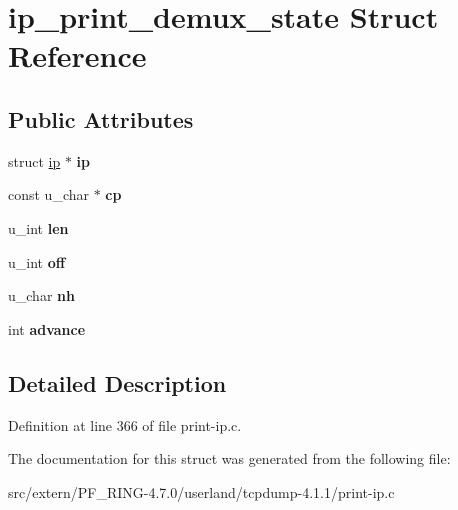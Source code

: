 \hypertarget{structip__print__demux__state}{
\section{ip\_\-print\_\-demux\_\-state Struct Reference}
\label{structip__print__demux__state}
}
\subsection*{Public Attributes}
\begin{DoxyCompactItemize}
\item 
\hypertarget{structip__print__demux__state_a21d3a9f3db1ef7fbed12e53990cbe2c6}{
struct \hyperlink{structip}{ip} $\ast$ {\bfseries ip}}
\label{structip__print__demux__state_a21d3a9f3db1ef7fbed12e53990cbe2c6}

\item 
\hypertarget{structip__print__demux__state_a193656bdacf86e654ac0313e9a2ec096}{
const u\_\-char $\ast$ {\bfseries cp}}
\label{structip__print__demux__state_a193656bdacf86e654ac0313e9a2ec096}

\item 
\hypertarget{structip__print__demux__state_a34bb7647a073879d87ffdd12d3d54f54}{
u\_\-int {\bfseries len}}
\label{structip__print__demux__state_a34bb7647a073879d87ffdd12d3d54f54}

\item 
\hypertarget{structip__print__demux__state_aa793ee83eef36f00cae00e55ce3dc9e9}{
u\_\-int {\bfseries off}}
\label{structip__print__demux__state_aa793ee83eef36f00cae00e55ce3dc9e9}

\item 
\hypertarget{structip__print__demux__state_af060f9badc40d659609a02f775dc9463}{
u\_\-char {\bfseries nh}}
\label{structip__print__demux__state_af060f9badc40d659609a02f775dc9463}

\item 
\hypertarget{structip__print__demux__state_a78b94a58f1ab02483c7d7407af7bd892}{
int {\bfseries advance}}
\label{structip__print__demux__state_a78b94a58f1ab02483c7d7407af7bd892}

\end{DoxyCompactItemize}


\subsection{Detailed Description}


Definition at line 366 of file print-\/ip.c.



The documentation for this struct was generated from the following file:\begin{DoxyCompactItemize}
\item 
src/extern/PF\_\-RING-\/4.7.0/userland/tcpdump-\/4.1.1/print-\/ip.c\end{DoxyCompactItemize}
